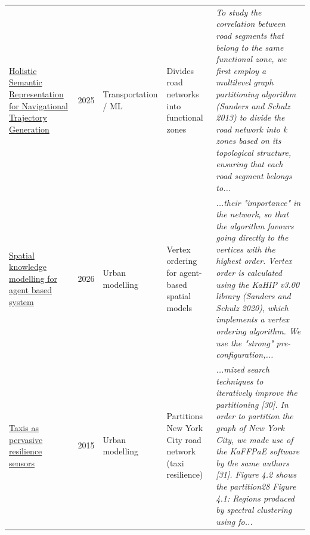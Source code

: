 \documentclass[9pt]{extarticle}
\begin{document}
\begin{longtable}{@{}>{\raggedright}p{6.6cm}r>{\raggedright}p{2.9cm}>{\raggedright}p{4.6cm}>{\raggedright\arraybackslash}p{8.4cm}@{}}
\href{https://doi.org/10.1609/aaai.v39i1.31978}{Holistic Semantic Representation for Navigational Trajectory Generation} & 2025 & Transportation / ML & Divides road networks into functional zones & {\footnotesize\itshape To study the correlation between road segments that belong to the same functional zone, we first employ a multilevel graph partitioning algorithm (Sanders and Schulz 2013) to divide the road network into k zones based on its topological structure, ensuring that each road segment belongs to...}\\
\href{https://doi.org/10.46298/jimis.15732}{Spatial knowledge modelling for agent based system} & 2026 & Urban modelling & Vertex ordering for agent-based spatial models & {\footnotesize\itshape ...their "importance" in the network, so that the algorithm favours going directly to the vertices with the highest order. Vertex order is calculated using the KaHIP v3.00 library (Sanders and Schulz 2020), which implements a vertex ordering algorithm. We use the "strong" pre-configuration,...}\\
\href{http://hdl.handle.net/2142/78477}{Taxis as pervasive resilience sensors} & 2015 & Urban modelling & Partitions New York City road network (taxi resilience) & {\footnotesize\itshape ...mized search techniques to iteratively improve the partitioning [30]. In order to partition the graph of New York City, we made use of the KaFFPaE software by the same authors [31]. Figure 4.2 shows the partition28 Figure 4.1: Regions produced by spectral clustering using fo...}\\
\bottomrule\end{longtable}
\end{document}
